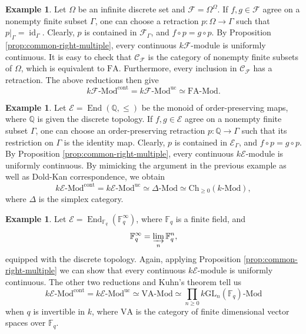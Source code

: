 \documentclass[10pt, reqno]{amsart}
\theoremstyle{plain}
\numberwithin{equation}{section}
\theoremstyle{definition}
\newtheorem{example}[theorem]{Example}
\newcommand{\End}{\operatorname{End}}
\newcommand{\Mod}{{\textrm{-}\mathrm{Mod}}}
\newcommand{\id}{\operatorname{id}}
\newcommand{\FA}{\mathrm{FA}}
\newcommand{\E}{\mathscr E}
\newcommand{\C}{\mathscr C}
\begin{document}
\begin{example} \label{full example}
Let $\Omega$ be an infinite discrete set and $\mathscr{F} = \Omega^{\Omega}$. If $f, g \in \mathscr{F}$ agree on a nonempty finite subset $\Gamma$, one can choose a retraction $p: \Omega \to \Gamma$ such that $p|_\Gamma = \id_{\Gamma}$. Clearly, $p$ is contained in $\mathscr{F}_\Gamma$, and $f \circ p = g \circ p$. By Proposition \ref{prop:common-right-multiple}, every continuous $k\mathscr{F}$-module is uniformly continuous. It is easy to check that $\C_\mathscr{F}$ is the category of nonempty finite subsets of $\Omega$, which is equivalent to $\FA$. Furthermore, every inclusion in $\C_\mathscr{F}$ has a retraction. The above reductions then give \[
k\mathscr{F} \Mod^{\mathrm{cont}} = k\mathscr{F} \Mod^{\mathrm{uc}} \simeq \mathrm{FA} \Mod.
\]
\end{example}

\begin{example}
Let $\E = \End(\mathbb{Q}, \leqslant)$ be the monoid of order-preserving maps, where $\mathbb{Q}$ is given the discrete topology. If $f, g \in \E$ agree on a nonempty finite subset $\Gamma$, one can choose an order-preserving retraction $p: \mathbb{Q} \to \Gamma$ such that its restriction on $\Gamma$ is the identity map. Clearly, $p$ is contained in $\E_\Gamma$, and $f \circ p = g \circ p$. By Proposition \ref{prop:common-right-multiple}, every continuous $k\E$-module is uniformly continuous. By mimicking the argument in the previous example as well as Dold-Kan correspondence, we obtain
\[
k\E \Mod^{\mathrm{cont}} = k\E \Mod^{\mathrm{uc}} \simeq \Delta \Mod \simeq \mathrm{Ch}_{\geqslant 0} (k \Mod),
\]
where $\Delta$ is the simplex category.
\end{example}

\begin{example}
Let $\E = \End_{\mathbb{F}_q}(\mathbb{F}_q^{\infty})$, where $\mathbb{F}_q$ is a finite field, and
\[
\mathbb{F}_q^{\infty} = \varinjlim_n \mathbb{F}_q^n,
\]
equipped with the discrete topology. Again, applying Proposition \ref{prop:common-right-multiple} we can show that every continuous $k\E$-module is uniformly continuous. The other two reductions and Kuhn's theorem \cite{Kuhn} tell us
\[
k\E \Mod^{\mathrm{cont}} = k\E \Mod^{\mathrm{uc}} \simeq \mathrm{VA} \Mod \simeq \prod_{n \geqslant 0} k \mathrm{GL}_n(\mathbb{F}_q) \Mod
\]
when $q$ is invertible in $k$, where $\mathrm{VA}$ is the category of finite dimensional vector spaces over $\mathbb{F}_q$.
\end{example}
\end{document}
